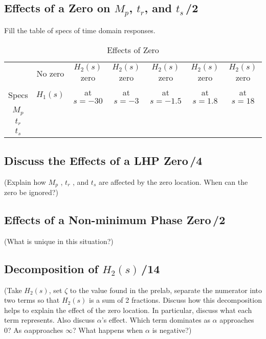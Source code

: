 \documentclass{article}
\newcommand{\score}{\hfill \underline{\hspace{0.65cm}}\,/} %
\begin{document}
\subsection{Effects of a Zero on $M_p$, $t_r$, and $t_s$\score 2}
Fill the table of specs of time domain responses.

\begin{table}[phtb]\footnotesize \label{tbl:lab2_q2}
\begin{center}
\caption{Effects of Zero}
\begin{tabular}{c|c|c|c|c|c|c} \hline \hline
\rowcolor{Grey} & No zero & $H_2(s)$ zero &  $H_2(s)$ zero &  $H_2(s)$ zero  &  $H_2(s)$ zero &  $H_2(s)$ zero \\
\rowcolor{Grey} Specs & $H_1(s)$ & at $s = -30$ & at $s = -3$ &  at $s = -1.5$ &   at $s = 1.8$ &   at $s = 18$ \\ \hline
$M_p$ &  &  &  &  &  &  \\ \hline
$t_r$ &  &  &  &  &  &  \\ \hline
$t_s$ &  &  &  &  &  & \\ \hline
\end{tabular}
\end{center}
\end{table}

\subsection{Discuss the Effects of a LHP Zero\score 4}
(Explain how $M_p$ , $t_r$ , and $t_s$ are affected by the zero location. When can the zero be ignored?)

\subsection{Effects of a Non-minimum Phase Zero\score 2}
(What is unique in this situation?)

\subsection{Decomposition of $H_2(s)$\score 14}
(Take $H_2(s)$, set $\zeta$ to the value found in the prelab, separate the numerator into two terms so that $H_2(s)$ is a sum of 2 fractions. Discuss how this decomposition helps to explain the effect of the zero location. In particular, discuss what each term represents. Also discuss $\alpha$'s effect. Which term dominates as $\alpha$ approaches 0? As $\alpha$approaches $\infty$?  What happens when $\alpha$ is negative?)
\end{document}
